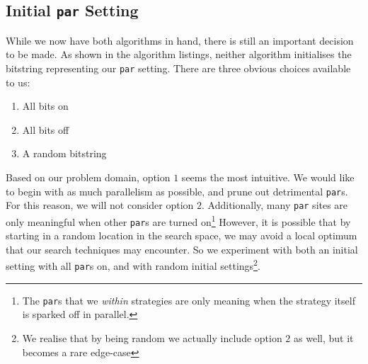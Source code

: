 \subsection{Initial \texttt{par} Setting}

While we now have both algorithms in hand, there is still an important decision
to be made. As shown in the algorithm listings, neither algorithm initialises
the bitstring representing our \verb|par| setting. There are three obvious
choices available to us:

\begin{enumerate}
    \item All bits on
    \item All bits off
    \item A random bitstring
\end{enumerate}

Based on our problem domain, option $1$ seems the most intuitive. We would like
to begin with as much parallelism as possible, and prune out detrimental
\verb|par|s. For this reason, we will not consider option $2$. Additionally,
many \verb|par| sites are only meaningful when other \verb|par|s are turned
on\footnote{The \texttt{par}s that we \emph{within} strategies are only meaning
when the strategy itself is sparked off in parallel.} However, it is possible
that by starting in a random location in the search space, we may avoid a local
optimum that our search techniques may encounter. So we experiment with both an
initial setting with all \verb|par|s on, and with random initial
settings\footnote{We realise that by being random we actually include option
$2$ as well, but it becomes a rare edge-case}.
